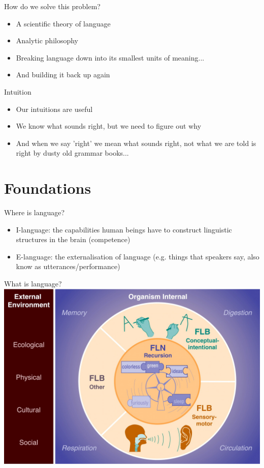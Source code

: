 \documentclass{beamer}
\begin{document}
\begin{frame}{How do we solve this problem?}
	\begin{itemize}
	\item A scientific theory of language
	\item Analytic philosophy
	\item Breaking language down into its smallest units of meaning...
	\item And building it back up again
	\end{itemize}

\end{frame}

\begin{frame}{Intuition}
	\begin{itemize}
	\item Our intuitions are useful
	\item We know what sounds right, but we need to figure out why
	\item And when we say 'right' we mean what sounds right, not what we are told is right by dusty old grammar books...
	\end{itemize}


\end{frame}

\section{Foundations}

\begin{frame}{Where is language?}
	\begin{itemize}
		\item I-language: the capabilities human beings have to construct linguistic structures in the brain (competence)
	\item E-language: the externalisation of language (e.g. things that speakers say, also know as utterances/performance)
	\end{itemize}

\end{frame}


\begin{frame}{What is language?}
	\includegraphics[scale=0.25]{FLN.jpg}
	\nocite{hauser2002faculty}
\end{frame}
\end{document}
